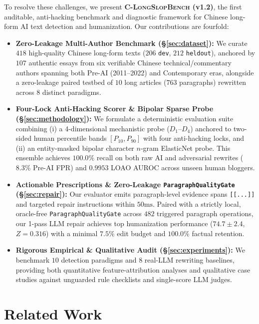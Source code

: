 \documentclass[11pt]{article}
\newcommand{\bench}{\textsc{C-LongSlopBench}}
\newcommand{\gate}{\texttt{ParagraphQualityGate}}
\begin{document}
To resolve these challenges, we present \textbf{\bench{} (v1.2)}, the first auditable, anti-hacking benchmark and diagnostic framework for Chinese long-form AI text detection and humanization. Our contributions are fourfold:
\begin{itemize}
    \item \textbf{Zero-Leakage Multi-Author Benchmark (\S\ref{sec:dataset}):} We curate $418$ high-quality Chinese long-form texts ($206$ \texttt{dev}, $212$ \texttt{heldout}), anchored by $107$ authentic essays from six verifiable Chinese technical/commentary authors spanning both Pre-AI (2011--2022) and Contemporary eras, alongside a zero-leakage paired testbed of $10$ long articles ($763$ paragraphs) rewritten across $8$ distinct paradigms.
    \item \textbf{Four-Lock Anti-Hacking Scorer \& Bipolar Sparse Probe (\S\ref{sec:methodology}):} We formulate a deterministic evaluation suite combining (i) a 4-dimensional mechanistic probe ($D_1$--$D_4$) anchored to two-sided human percentile bands $[P_{10}, P_{90}]$ with four anti-hacking locks, and (ii) an entity-masked bipolar character $n$-gram ElasticNet probe. This ensemble achieves $100.0\%$ recall on both raw AI and adversarial rewrites ($8.3\%$ Pre-AI FPR) and $0.9953$ LOAO AUROC across unseen human bloggers.
    \item \textbf{Actionable Prescriptions \& Zero-Leakage \gate{} (\S\ref{sec:repair}):} Our evaluator emits paragraph-level evidence spans \texttt{[[...]]} and targeted repair instructions within $50\text{ms}$. Paired with a strictly local, oracle-free \gate{} across $482$ triggered paragraph operations, our 1-pass LLM repair achieves top humanization performance ($74.7 \pm 2.4$, $Z=0.316$) with a minimal $7.5\%$ edit budget and $100.0\%$ factual retention.
    \item \textbf{Rigorous Empirical \& Qualitative Audit (\S\ref{sec:experiments}):} We benchmark $10$ detection paradigms and $8$ real-LLM rewriting baselines, providing both quantitative feature-attribution analyses and qualitative case studies against unguarded rule checklists and single-score LLM judges.
\end{itemize}

\section{Related Work}
\end{document}
